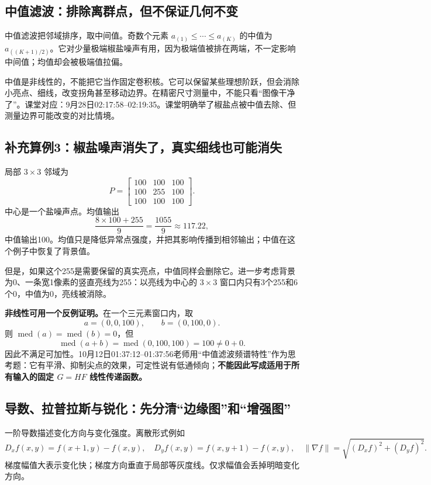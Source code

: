 \subsection{中值滤波：排除离群点，但不保证几何不变}
中值滤波把邻域排序，取中间值。奇数个元素 $a_{(1)}\leq\cdots\leq a_{(K)}$ 的中值为 $a_{((K+1)/2)}$。它对少量极端椒盐噪声有用，因为极端值被排在两端，不一定影响中间值；均值却会被极端值拉偏。

中值是非线性的，不能把它当作固定卷积核。它可以保留某些理想阶跃，但会消除小亮点、细线，改变拐角甚至移动边界。在精密尺寸测量中，不能只看“图像干净了”。课堂对应：9月28日02:17:58--02:19:35。课堂明确举了椒盐点被中值去除、但测量边界可能改变的对比情境。

\subsection{补充算例3：椒盐噪声消失了，真实细线也可能消失}
局部 $3\times3$ 邻域为
\[
P=\begin{bmatrix}100&100&100\\100&255&100\\100&100&100\end{bmatrix}.
\]
中心是一个盐噪声点。均值输出
\[
\frac{8\times100+255}{9}=\frac{1055}{9}\approx117.22,
\]
中值输出100。均值只是降低异常点强度，并把其影响传播到相邻输出；中值在这个例子中恢复了背景值。

但是，如果这个255是需要保留的真实亮点，中值同样会删除它。进一步考虑背景为0、一条宽1像素的竖直亮线为255：以亮线为中心的 $3\times3$ 窗口内只有3个255和6个0，中值为0，亮线被消除。

\textbf{非线性可用一个反例证明。}在一个三元素窗口内，取
\[
a=(0,0,100),\qquad b=(0,100,0).
\]
则 $\operatorname{med}(a)=\operatorname{med}(b)=0$，但
\[
\operatorname{med}(a+b)=\operatorname{med}(0,100,100)=100\ne0+0.
\]
因此不满足可加性。10月12日01:37:12--01:37:56老师用“中值滤波频谱特性”作为思考题：它有平滑、抑制尖点的效果，可定性说有低通倾向；\textbf{不能因此写成适用于所有输入的固定 $G=HF$ 线性传递函数。}

\subsection{导数、拉普拉斯与锐化：先分清“边缘图”和“增强图”}
一阶导数描述变化方向与变化强度。离散形式例如
\[
D_xf(x,y)=f(x+1,y)-f(x,y),\quad
D_yf(x,y)=f(x,y+1)-f(x,y),\quad
\lVert\nabla f\rVert=\sqrt{(D_xf)^2+(D_yf)^2}.
\]
梯度幅值大表示变化快；梯度方向垂直于局部等灰度线。仅求幅值会丢掉明暗变化方向。

